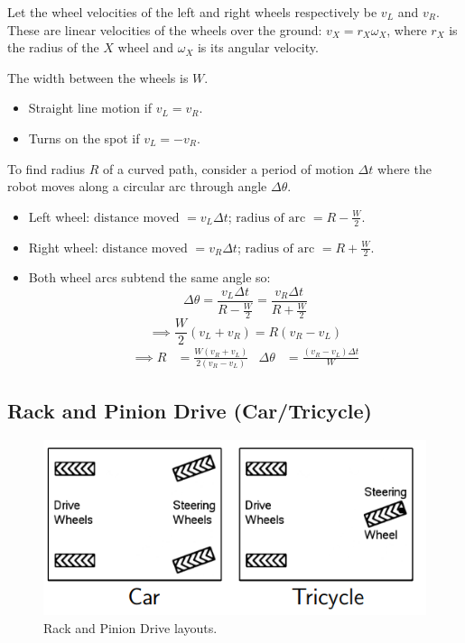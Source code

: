 \documentclass[11pt]{article}
\begin{document}
Let the wheel velocities of the left and right wheels respectively be $v_L$ and $v_R$.
These are linear velocities of the wheels over the ground: $v_X = r_X\omega_X$, where $r_X$ is the radius of the $X$ wheel and $\omega_X$ is its angular velocity.

The width between the wheels is $W$.

\begin{itemize}
  \item Straight line motion if $v_L = v_R$.
  \item Turns on the spot if $v_L = - v_R$.
\end{itemize}

To find radius $R$ of a curved path, consider a period of motion $\Delta t$ where the robot moves along a circular arc through angle $\Delta \theta$.
\begin{itemize}
  \item Left wheel: $\text{distance moved } = v_L \Delta t$; $\text{radius of arc } = R - \frac{W}{2}$.
  \item Right wheel: $\text{distance moved } = v_R \Delta t$; $\text{radius of arc } = R + \frac{W}{2}$.
  \item Both wheel arcs subtend the same angle so:
    \[
      \Delta \theta = \frac{v_L \Delta t}{R - \frac{W}{2}} = \frac{v_R \Delta t}{R + \frac{W}{2}}
    \]
    \[
      \implies \frac{W}{2}(v_L + v_R) = R(v_R - v_L)
    \]
    \begin{align*}
      \implies R &= \frac{W(v_R + v_L)}{2(v_R - v_L)} & \Delta \theta &= \frac{(v_R - v_L)\Delta t}{W}
    \end{align*}
\end{itemize}

\subsection{Rack and Pinion Drive (Car/Tricycle)}
\begin{figure}[h]
  \caption{Rack and Pinion Drive layouts.}
  \includegraphics[scale=0.4]{piniondrive}
  \centering
\end{figure}
\end{document}
